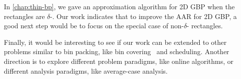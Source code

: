 In \cref{chap:thin-bp}, we gave an approximation algorithm for 2D GBP
when the rectangles are $\delta$-\thin{}.
Our work indicates that to improve the AAR for 2D GBP,
a good next step would be to focus on the special case of non-$\delta$-\thin{} rectangles.

Finally, it would be interesting to see if our work can be extended to
other problems similar to bin packing, like bin covering~\cite{assmann1984dual} and scheduling.
Another direction is to explore different problem paradigms, like online algorithms,
or different analysis paradigms, like average-case analysis.
